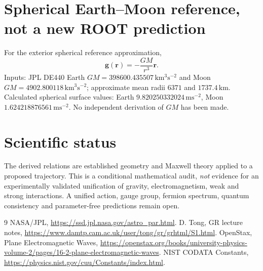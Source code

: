 \documentclass[11pt,a4paper]{article}
\begin{document}
\section{Spherical Earth--Moon reference, not a new ROOT prediction}
For the exterior spherical reference approximation,
\begin{equation}
\mathbf g(\mathbf r)=-\frac{GM}{r^3}\mathbf r.
\end{equation}
Inputs: JPL DE440 Earth $GM=398600.435507\,\mathrm{km^3s^{-2}}$ and Moon $GM=4902.800118\,\mathrm{km^3s^{-2}}$; approximate mean radii $6371$ and $1737.4\,\mathrm{km}$.
Calculated spherical surface values: Earth $9.820250332024\,\mathrm{ms^{-2}}$, Moon $1.624218876561\,\mathrm{ms^{-2}}$. No independent derivation of $GM$ has been made.
\section{Scientific status}
The derived relations are established geometry and Maxwell theory applied to a proposed trajectory. This is a conditional mathematical audit, \emph{not} evidence for an experimentally validated unification of gravity, electromagnetism, weak and strong interactions. A unified action, gauge group, fermion spectrum, quantum consistency and parameter-free predictions remain open.
\begin{thebibliography}{9}
 NASA/JPL, \url{https://ssd.jpl.nasa.gov/astro_par.html}.
 D. Tong, GR lecture notes, \url{https://www.damtp.cam.ac.uk/user/tong/gr/grhtml/S1.html}.
 OpenStax, Plane Electromagnetic Waves, \url{https://openstax.org/books/university-physics-volume-2/pages/16-2-plane-electromagnetic-waves}.
 NIST CODATA Constants, \url{https://physics.nist.gov/cuu/Constants/index.html}.
\end{thebibliography}
\end{document}
